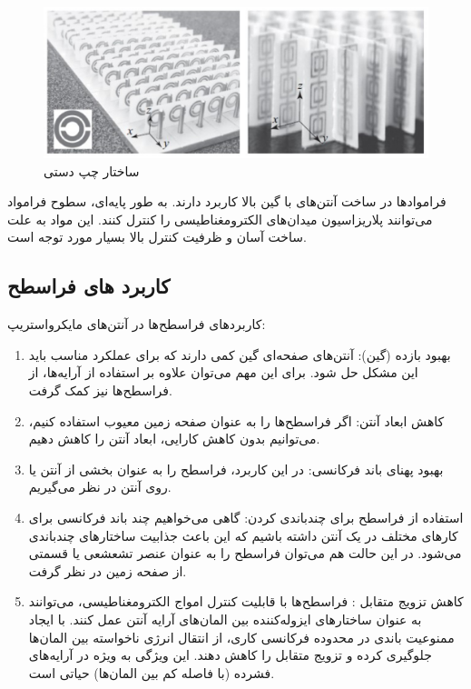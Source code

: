  
\begin{figure}
	\centering
	\includegraphics[scale=0.3]{Images/fig34.png}
	\caption{ساختار چپ دستی}
	\label{fig34}
\end{figure}

فراموادها در ساخت آنتن‌های با گین بالا کاربرد دارند. به طور پایه‌ای، سطوح فرامواد
 می‌توانند پلاریزاسیون میدان‌های الکترومغناطیسی را کنترل کنند.
این مواد به علت ساخت آسان و ظرفیت کنترل بالا بسیار مورد توجه است.

\subsection{کاربرد های فراسطح}
 کاربردهای فراسطح‌ها در آنتن‌های مایکرواستریپ:
\begin{enumerate}
	\item{
	بهبود بازده (گین): آنتن‌های صفحه‌ای گین کمی دارند که برای عملکرد مناسب باید این مشکل حل شود. برای این مهم می‌توان علاوه بر استفاده از آرایه‌ها، از فراسطح‌ها نیز کمک گرفت.
	}
	\item{
	کاهش ابعاد آنتن: اگر فراسطح‌ها را به عنوان صفحه زمین معیوب
	 استفاده کنیم، می‌توانیم بدون کاهش کارایی، ابعاد آنتن را کاهش دهیم.
	}
	\item{
	بهبود پهنای باند فرکانسی: در این کاربرد، فراسطح را به عنوان بخشی از آنتن یا روی آنتن در نظر می‌گیریم.
	}
	\item{
	استفاده از فراسطح برای چندباندی کردن: گاهی می‌خواهیم چند باند فرکانسی برای کارهای مختلف در یک آنتن داشته باشیم که این باعث جذابیت ساختارهای چندباندی می‌شود. در این حالت هم می‌توان فراسطح را به عنوان عنصر تشعشعی یا قسمتی از صفحه زمین در نظر گرفت.
	}
	\item{
	کاهش تزویج متقابل : فراسطح‌ها با قابلیت کنترل امواج الکترومغناطیسی، می‌توانند به عنوان ساختارهای ایزوله‌کننده بین المان‌های آرایه آنتن عمل کنند. با ایجاد ممنوعیت باندی
	 در محدوده فرکانسی کاری، از انتقال انرژی ناخواسته بین المان‌ها جلوگیری کرده و تزویج متقابل را کاهش دهند. این ویژگی به ویژه در آرایه‌های فشرده (با فاصله کم بین المان‌ها) حیاتی است.
	}
\end{enumerate}

